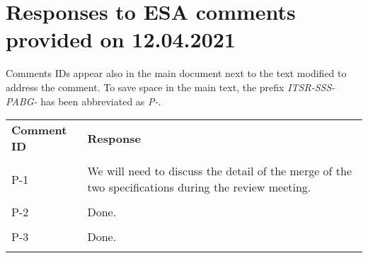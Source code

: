 
\section{Responses to ESA comments provided on 12.04.2021}
\label{sec:ESA:comments:1}

Comments IDs appear also in the main document next to the text modified to address the comment. To save space in the main text, the prefix \emph{ITSR-SSS-PABG-} has been abbreviated as \emph{P-}.

\setlength\LTleft{0pt}
\setlength\LTright{0pt}
\tiny 
\begin{longtable}{|p{1.5cm}|p{12cm}|@{}}
\textbf{Comment ID}&\textbf{Response}\\
\\
\hline
P-1&
\begin{minipage}{12cm}
We will need to discuss the detail of the merge of the two specifications during the review meeting.
\end{minipage}\\
\\
\hline

P-2&
\begin{minipage}{12cm}
Done.
\end{minipage}\\
\\
\hline

P-3&
\begin{minipage}{12cm}
Done.
\end{minipage}\\
\\
\hline
                                                
\end{longtable}
\normalsize

\clearpage